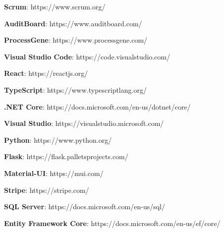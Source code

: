\adjustmtc
\renewcommand\bibname{BIBLIOGRAPHIE}
\begin{thebibliography}{99}
\thispagestyle{MyStyle}
\textbf{Scrum}: https://www.scrum.org/

\textbf{AuditBoard}: https://www.auditboard.com/

\textbf{ProcessGene}: https://www.processgene.com/

\textbf{Visual Studio Code}: https://code.visualstudio.com/

\textbf{React}: https://reactjs.org/

\textbf{TypeScript}: https://www.typescriptlang.org/

\textbf{.NET Core}: https://docs.microsoft.com/en-us/dotnet/core/

\textbf{Visual Studio}: https://visualstudio.microsoft.com/

\textbf{Python}: https://www.python.org/

\textbf{Flask}: https://flask.palletsprojects.com/

\textbf{Material-UI}: https://mui.com/

\textbf{Stripe}: https://stripe.com/

\textbf{SQL Server}: https://docs.microsoft.com/en-us/sql/

\textbf{Entity Framework Core}: https://docs.microsoft.com/en-us/ef/core/

\end{thebibliography}